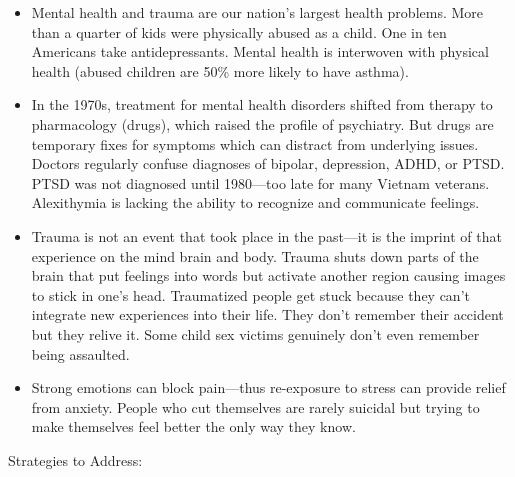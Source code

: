 \documentclass[
]{article}
\begin{document}
\begin{itemize}
\item
  Mental health and trauma are our nation's largest health problems.
  More than a quarter of kids were physically abused as a child. One in
  ten Americans take antidepressants. Mental health is interwoven with
  physical health (abused children are 50\% more likely to have asthma).
\item
  In the 1970s, treatment for mental health disorders shifted from
  therapy to pharmacology (drugs), which raised the profile of
  psychiatry. But drugs are temporary fixes for symptoms which can
  distract from underlying issues. Doctors regularly confuse diagnoses
  of bipolar, depression, ADHD, or PTSD. PTSD was not diagnosed until
  1980---too late for many Vietnam veterans. Alexithymia is lacking the
  ability to recognize and communicate feelings.
\item
  Trauma is not an event that took place in the past---it is the imprint
  of that experience on the mind brain and body. Trauma shuts down parts
  of the brain that put feelings into words but activate another region
  causing images to stick in one's head. Traumatized people get stuck
  because they can't integrate new experiences into their life. They
  don't remember their accident but they relive it. Some child sex
  victims genuinely don't even remember being assaulted.
\item
  Strong emotions can block pain---thus re-exposure to stress can
  provide relief from anxiety. People who cut themselves are rarely
  suicidal but trying to make themselves feel better the only way they
  know.
\end{itemize}

Strategies to Address:
\end{document}
